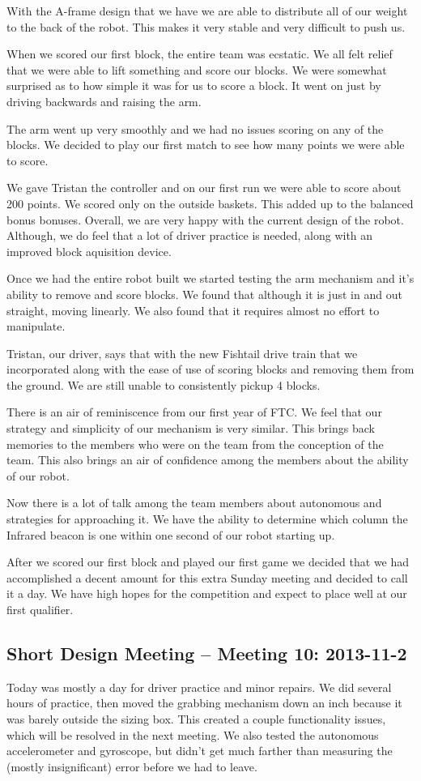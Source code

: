With the A-frame design that we have we are able to distribute all of our weight to the back of the robot. This makes it very stable and very difficult to push us. 

When we scored our first block, the entire team was ecstatic. We all felt relief that we were able to lift something and score our blocks. We were somewhat surprised as to how simple it was for us to score a block. It went on just by driving backwards and raising the arm.

The arm went up very smoothly and we had no issues scoring on any of the blocks. We decided to play our first match to see how many points we were able to score.

We gave Tristan the controller and on our first run we were able to score about 200 points. We scored only on the outside baskets. This added up to the balanced bonus bonuses. Overall, we are very happy with the current design of the robot. Although, we do feel that a lot of driver practice is needed, along with an improved block aquisition device. 

Once we had the entire robot built we started testing the arm mechanism and it's ability to remove and score blocks. We found that although it is just in and out straight, moving linearly. We also found that it requires almost no effort to manipulate.

Tristan, our driver, says that with the new Fishtail drive train that we incorporated along with the ease of use of scoring blocks and removing them from the ground. We are still unable to consistently pickup 4 blocks. 

There is an air of reminiscence from our first year of FTC. We feel that our strategy and simplicity of our mechanism is very similar. This brings back memories to the members who were on the team from the conception of the team. This also brings an air of confidence among the members about the ability of our robot.

Now there is a lot of talk among the team members about autonomous and strategies for approaching it. We have the ability to determine which column the Infrared beacon is one within one second of our robot starting up.

After we scored our first block and played our first game we decided that we had accomplished a decent amount for this extra Sunday meeting and decided to call it a day. We have high hopes for the competition and expect to place well at our first qualifier. 

\newpage \subsection{Short Design Meeting -- Meeting 10: 2013-11-2}
Today was mostly a day for driver practice and minor repairs. We did several hours of practice, then moved the grabbing mechanism down an inch because it was barely outside the sizing box. This created a couple functionality issues, which will be resolved in the next meeting. We also tested the autonomous accelerometer and gyroscope, but didn't get much farther than measuring the (mostly insignificant) error before we had to leave. 

